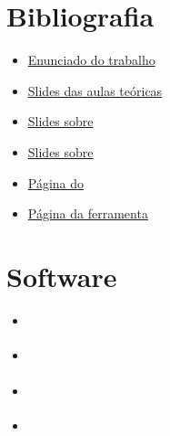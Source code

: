 \documentclass[12pt]{report}
\begin{document}
\section{Bibliografia}

\begin{itemize}
	\item \href{https://paginas.fe.up.pt/~eol/AIAD/1617/trabalhos.html#T05}{Enunciado do trabalho}
	\item \href{https://paginas.fe.up.pt/~eol/AIAD/aiad1617.html}{Slides das aulas teóricas}
	\item \href{https://paginas.fe.up.pt/~eol/AIAD/aulas/jade_en.pdf}{Slides sobre \jade}
	\item \href{https://paginas.fe.up.pt/~eol/AIAD/aulas/REPAST_intro_hlc.pdf}{Slides sobre \repast}
	\item \href{https://web.fe.up.pt/~hlc/doku.php?id=sajas}{Página do \sajas}
	\item \href{https://web.fe.up.pt/~hlc/doku.php?id=massim2dev}{Página da ferramenta \massim}
\end{itemize}

\section{Software}

\begin{itemize}
	\item \href{http://jade.tilab.com}{\jade}
	\item \href{http://repast.sourceforge.net/repast_3/index.html}{\repast}
	\item \href{https://web.fe.up.pt/~hlc/doku.php?id=sajas}{\sajas}
	\item \href{https://web.fe.up.pt/~hlc/doku.php?id=massim2dev}{\massim}
\end{itemize}
\end{document}
